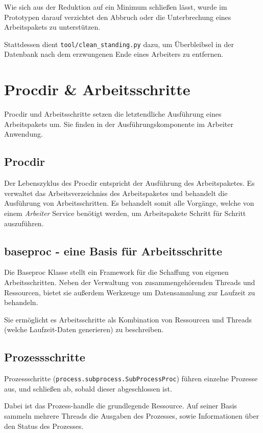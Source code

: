 Wie sich aus der Reduktion auf ein Minimum schließen lässt,
wurde im Prototypen darauf verzichtet den Abbruch oder die Unterbrechung
eines Arbeitspakets zu unterstützen.

Stattdessen dient \verb|tool/clean_standing.py| dazu,
um Überbleibsel in der Datenbank nach dem erzwungenen Ende
eines Arbeiters zu entfernen.



\section{Procdir \& Arbeitsschritte}

Procdir und Arbeitsschritte setzen die letztendliche Ausführung eines Arbeitspakets um.
Sie finden in der Ausführungskomponente im Arbeiter Anwendung.


\subsection{Procdir}

Der Lebenszyklus des Procdir entspricht der Ausführung des Arbeitspaketes.
Es verwaltet das Arbeitsverzeichniss des Arbeitspaketes und behandelt die Ausführung von Arbeitsschritten.
Es behandelt somit alle Vorgänge, welche von einem \emph{Arbeiter} Service benötigt werden, um  Arbeitspakete Schritt für Schritt auszuführen.

\subsection{baseproc - eine Basis für Arbeitsschritte}

Die Baseproc Klasse stellt ein Framework für die Schaffung von eigenen Arbeitsschritten.
Neben der Verwaltung von zusammengehörenden Threads und Ressourcen, bietet sie außerdem Werkzeuge um Datensammlung zur Laufzeit zu behandeln.

Sie ermöglicht es Arbeitsschritte als Kombination von Ressourcen und Threads (welche Laufzeit-Daten generieren) zu beschreiben.


\subsection{Prozessschritte}

Prozessschritte (\verb|process.subprocess.SubProcessProc|)
führen einzelne Prozesse aus, und schließen ab, sobald dieser
abgeschlossen ist.

Dabei ist das Prozess-handle die grundlegende Ressource.
Auf seiner Basis sammeln mehrere Threads die Ausgaben des Prozesses, sowie Informationen über den Status des Prozesses.

